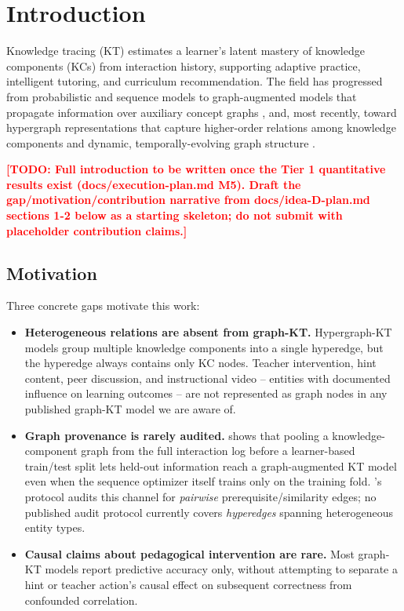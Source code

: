 \documentclass[journal]{IEEEtran}
\newcommand{\todo}[1]{\textcolor{red}{\textbf{[TODO: #1]}}}
\begin{document}
\section{Introduction}

Knowledge tracing (KT) estimates a learner's latent mastery of knowledge
components (KCs) from interaction history, supporting adaptive practice,
intelligent tutoring, and curriculum recommendation. The field has
progressed from probabilistic and sequence models
\cite{piech2015dkt} to graph-augmented models that propagate information
over auxiliary concept graphs \cite{nakagawa2019gkt,yang2021gikt}, and, most
recently, toward hypergraph representations that capture higher-order
relations among knowledge components \cite{thmn2025,hgkt2025,htkt2025} and
dynamic, temporally-evolving graph structure \cite{dygkt2024}.

\todo{Full introduction to be written once the Tier 1 quantitative results
exist (docs/execution-plan.md M5). Draft the gap/motivation/contribution
narrative from docs/idea-D-plan.md sections 1-2 below as a starting
skeleton; do not submit with placeholder contribution claims.}

\subsection{Motivation}
Three concrete gaps motivate this work:

\begin{itemize}
  \item \textbf{Heterogeneous relations are absent from graph-KT.}
  Hypergraph-KT models \cite{thmn2025,hgkt2025,htkt2025} group multiple
  knowledge components into a single hyperedge, but the hyperedge always
  contains only KC nodes. Teacher intervention, hint content, peer
  discussion, and instructional video -- entities with documented influence
  on learning outcomes -- are not represented as graph nodes in any
  published graph-KT model we are aware of.
  \item \textbf{Graph provenance is rarely audited.} \cite{daominh2026p0}
  shows that pooling a knowledge-component graph from the full interaction
  log before a learner-based train/test split lets held-out information
  reach a graph-augmented KT model even when the sequence optimizer itself
  trains only on the training fold. \cite{daominh2026p0}'s protocol audits
  this channel for \emph{pairwise} prerequisite/similarity edges; no
  published audit protocol currently covers \emph{hyperedges} spanning
  heterogeneous entity types.
  \item \textbf{Causal claims about pedagogical intervention are rare.} Most
  graph-KT models report predictive accuracy only, without attempting to
  separate a hint or teacher action's causal effect on subsequent
  correctness from confounded correlation.
\end{itemize}
\end{document}
